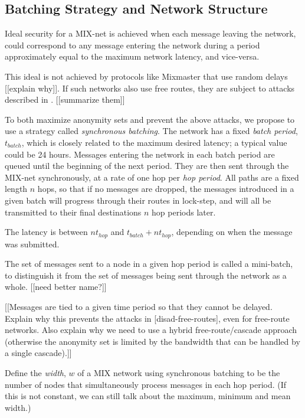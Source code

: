 \documentclass{llncs}
\begin{document}
\subsection{Batching Strategy and Network Structure}
\label{subsec:batching}


Ideal security for a MIX-net is achieved when each message leaving the
network, could correspond to any message entering the network during a
period approximately equal to the maximum network latency, and vice-versa.

This ideal is not achieved by protocols like Mixmaster that use random
delays [[explain why]].
If such networks also use free routes, they are subject to attacks
described in \cite{disad-free-routes}. [[summarize them]]

To both maximize anonymity sets and prevent the above attacks, we
propose to use a strategy called {\em synchronous batching}.
The network has a fixed {\em batch period}, $t_{batch}$, which is closely
related to the maximum desired latency; a typical value could be 24 hours.
Messages entering the network in each batch period are queued until
the beginning of the next period. They are then sent through the MIX-net
synchronously, at a rate of one hop per {\em hop period}. All paths are
a fixed length $n$ hops, so that if no messages are dropped, the messages
introduced in a given batch will progress through their routes in
lock-step, and will all be transmitted to their final destinations $n$
hop periods later.

The latency is between $nt_{hop}$ and $t_{batch} + nt_{hop}$, depending
on when the message was submitted.

The set of messages sent to a node in a given hop period is called a
mini-batch, to distinguish it from the set of messages being sent
through the network as a whole. [[need better name?]]

[[Messages are tied to a given time period so that they cannot be delayed.
Explain why this prevents the attacks in [disad-free-routes], even
for free-route networks. Also explain why we need to use a hybrid
free-route/cascade approach (otherwise the anonymity set is limited by
the bandwidth that can be handled by a single cascade).]]

Define the {\em width}, $w$ of a MIX network using synchronous batching to
be the number of nodes that simultaneously process messages in each
hop period. (If this is not constant, we can still talk about the
maximum, minimum and mean width.)
\end{document}

